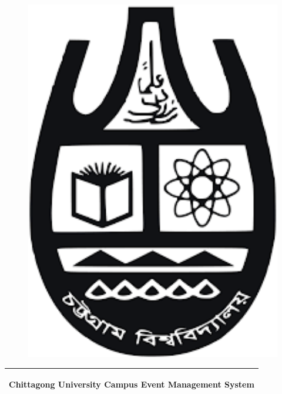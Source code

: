 \begin{titlepage}

\begin{figure}
	\centering
	\begin{minipage}[b]{0.15\textwidth}
		\includegraphics[width=1\textwidth]{images/cu}
	\end{minipage} \hfill
	\end{figure}
	
\noindent%
  \begin{tabular}{@{}p{\textwidth}@{}}
    \hline
    \hline
    \vspace{0.2cm}
    \begin{center}
    \Huge{\textbf{
      Chittagong University Campus Event Management System
    }}
    \end{center}
    \vspace{0.2cm}\\
    \hline
    \hline
  \end{tabular}
  \vspace{4 cm}


\end{titlepage}
